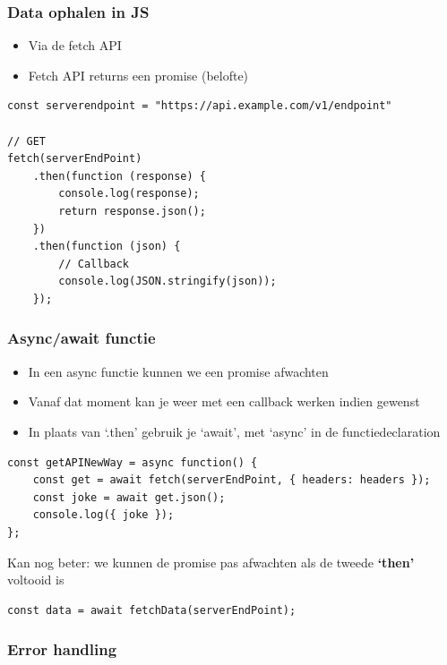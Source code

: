 \documentclass{article}
\newcommand{\bold}[1]{\textbf{#1}}
\begin{document}
\subsubsection{Data ophalen in JS}
\begin{itemize}
    \item Via de fetch API
    \item Fetch API returns een promise (belofte)
\end{itemize}

\begin{lstlisting}
const serverendpoint = "https://api.example.com/v1/endpoint"

// GET
fetch(serverEndPoint)
    .then(function (response) {
        console.log(response);
        return response.json();
    })
    .then(function (json) {
        // Callback
        console.log(JSON.stringify(json));
    });
\end{lstlisting}

\subsubsection{Async/await functie}

\begin{itemize}
    \item In een async functie kunnen we een promise afwachten
    \item Vanaf dat moment kan je weer met een callback werken indien gewenst
    \item In plaats van `.then' gebruik je `await', met `async' in de functiedeclaration
\end{itemize}

\begin{lstlisting}
const getAPINewWay = async function() {
    const get = await fetch(serverEndPoint, { headers: headers });
    const joke = await get.json();
    console.log({ joke });
};
\end{lstlisting}

Kan nog beter: we kunnen de promise pas afwachten als de tweede \bold{`then'} voltooid is

\begin{lstlisting}
const data = await fetchData(serverEndPoint);
\end{lstlisting}

\subsubsection{Error handling}
\end{document}

